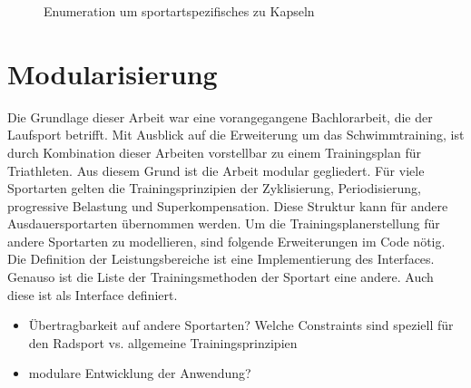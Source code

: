 \begin{figure}[htb]
    \caption{Enumeration um sportartspezifisches zu Kapseln}
    \label{fig:uml:solver}
\end{figure}

\section{Modularisierung}
Die Grundlage dieser Arbeit war eine vorangegangene Bachlorarbeit, die der Laufsport betrifft. Mit Ausblick auf die Erweiterung um das Schwimmtraining, ist durch Kombination dieser Arbeiten vorstellbar zu einem Trainingsplan für Triathleten. 
Aus diesem Grund ist die Arbeit modular gegliedert.
Für viele Sportarten gelten die Trainingsprinzipien der Zyklisierung, Periodisierung, progressive Belastung und Superkompensation. Diese Struktur kann für andere Ausdauersportarten übernommen werden. Um die Trainingsplanerstellung für andere Sportarten zu modellieren, sind folgende Erweiterungen im Code nötig.
Die Definition der Leistungsbereiche ist eine Implementierung des Interfaces. Genauso ist die Liste der Trainingsmethoden der Sportart eine andere. Auch diese ist als Interface definiert. 
\begin{itemize}
    \item Übertragbarkeit auf andere Sportarten? Welche Constraints sind speziell für den Radsport vs. allgemeine Trainingsprinzipien
    \item modulare Entwicklung der Anwendung?
\end{itemize}

